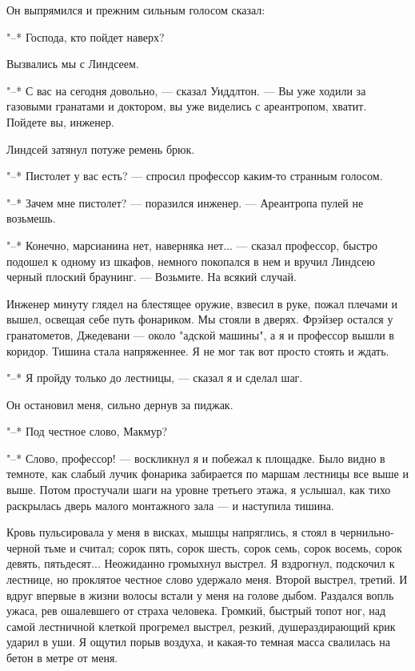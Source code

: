 Он выпрямился и прежним сильным голосом сказал:

"--* Господа, кто пойдет наверх?

Вызвались мы с Линдсеем.

"--* С вас на сегодня довольно, --- сказал Уиддлтон.  ---  Вы  уже  ходили  за
газовыми гранатами и доктором, вы  уже  виделись  с  ареантропом,  хватит.
Пойдете вы, инженер.

Линдсей затянул потуже ремень брюк.

"--* Пистолет у вас есть? --- спросил профессор каким-то странным голосом.

"--* Зачем мне пистолет?  ---  поразился  инженер.  ---  Ареантропа  пулей  не
возьмешь.

"--* Конечно, марсианина нет, наверняка нет... --- сказал профессор,  быстро
подошел к одному из шкафов, немного  покопался  в  нем  и  вручил  Линдсею
черный плоский браунинг. --- Возьмите. На всякий случай.

Инженер минуту глядел  на  блестящее  оружие,  взвесил  в  руке,  пожал
плечами и вышел, освещая себе путь фонариком. Мы стояли в дверях.  Фрэйзер
остался у гранатометов, Джедевани --- около "адской машины", а я и профессор
вышли в коридор. Тишина стала напряженнее. Я не мог так вот просто  стоять
и ждать.

"--* Я пройду только до лестницы, --- сказал я и сделал шаг.

Он остановил меня, сильно дернув за пиджак.

"--* Под честное слово, Макмур?

"--* Слово, профессор! --- воскликнул я и побежал к площадке. Было  видно  в
темноте, как слабый лучик фонарика забирается по маршам лестницы все  выше
и выше. Потом простучали шаги на уровне третьего  этажа,  я  услышал,  как
тихо раскрылась дверь малого монтажного зала --- и наступила тишина.

Кровь пульсировала у  меня  в  висках,  мышцы  напряглись,  я  стоял  в
чернильно-черной тьме и считал; сорок пять, сорок шесть, сорок семь, сорок
восемь,  сорок  девять,  пятьдесят...  Неожиданно  громыхнул  выстрел.   Я
вздрогнул, подскочил к лестнице, но проклятое честное слово удержало меня.
Второй выстрел, третий. И вдруг впервые в жизни волосы встали  у  меня  на
голове дыбом. Раздался вопль ужаса, рев  ошалевшего  от  страха  человека.
Громкий,  быстрый  топот  ног,  над  самой  лестничной  клеткой  прогремел
выстрел, резкий,  душераздирающий  крик  ударил  в  уши.  Я  ощутил  порыв
воздуха, и какая-то темная масса свалилась на бетон в метре от меня.

